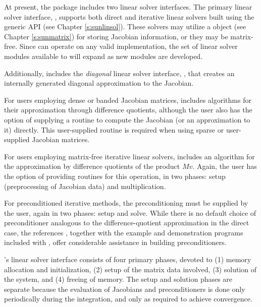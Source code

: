 At present, the package includes two linear solver interfaces.  The
primary linear solver interface, {\cvls}, supports both direct and
iterative linear solvers built using the generic {\sunlinsol} API (see
Chapter \ref{s:sunlinsol}).  These solvers may utilize a {\sunmatrix}
object (see Chapter \ref{s:sunmatrix}) for storing Jacobian
information, or they may be matrix-free. Since {\cvode} can operate on
any valid {\sunlinsol} implementation, the set of linear solver
modules available to {\cvode} will expand as new {\sunlinsol} modules
are developed.

Additionally, {\cvode} includes the {\em diagonal} linear solver
interface, {\cvdiag}, that creates an internally generated diagonal
approximation to the Jacobian.

For users employing dense or banded Jacobian matrices, {\cvode}
includes algorithms for their approximation through difference
quotients, although the user also has the option of supplying a
routine to compute the Jacobian (or an approximation to it) directly.
This user-supplied routine is required when using sparse or
user-supplied Jacobian matrices.

For users employing matrix-free iterative linear solvers,
 {\cvode}
includes an algorithm for the approximation by difference quotients of
the product $Mv$. Again, the user has the option of providing routines
for this operation, in two phases: setup (preprocessing of Jacobian
data) and multiplication.

For preconditioned iterative methods, 
the preconditioning must be supplied by the user, again in two phases:
setup and solve.  While there is no
default choice of preconditioner analogous to the difference-quotient
approximation in the direct case, the references
\cite{BrHi:89,Byr:92}, together with the example and demonstration
programs included with {\cvode}, offer considerable assistance in
building preconditioners.

{\cvode}'s linear solver interface consists of four primary phases,
devoted to (1) memory allocation and initialization, (2) setup of the
matrix data involved, (3) solution of the system, and (4) freeing of memory.
The setup and solution phases are separate because the evaluation of
Jacobians and preconditioners is done only periodically during the
integration, and only as required to achieve convergence.

